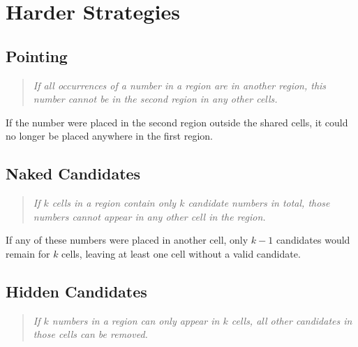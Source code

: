 \section{Harder Strategies}

\subsection*{Pointing}

\begin{quote}
    \textit{
        If all occurrences of a number in a region are in another region,
        this number cannot be in the second region in any other cells.
    }
\end{quote}

If the number were placed in the second region outside the shared cells,
it could no longer be placed anywhere in the first region.


\subsection*{Naked Candidates}

\begin{quote}
    \textit{
        If $k$ cells in a region contain only $k$ candidate numbers in total,
        those numbers cannot appear in any other cell in the region.
    }
\end{quote}

If any of these numbers were placed in another cell, only $k - 1$ candidates would remain for $k$ cells,
leaving at least one cell without a valid candidate.


\subsection*{Hidden Candidates}

\begin{quote}
    \textit{
        If $k$ numbers in a region can only appear in $k$ cells,
        all other candidates in those cells can be removed.
    }
\end{quote}

